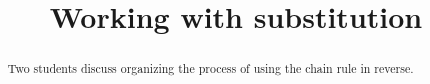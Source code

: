 \documentclass{ximera}
\title[Break-Ground:]{Working with substitution}
\begin{document}
\begin{abstract}
Two students discuss organizing the process of using the chain rule in reverse.
\end{abstract}
\maketitle





\end{document}
